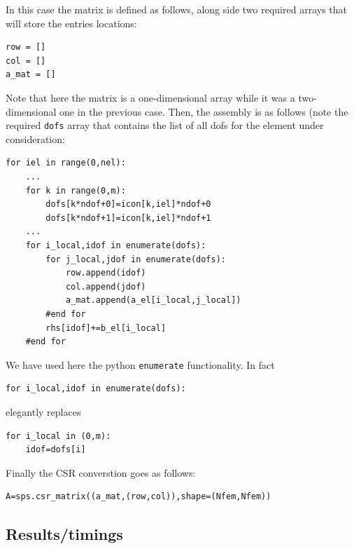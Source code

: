 In this case the matrix is defined as follows, along side two 
required arrays that will store the entries locations:
\begin{lstlisting}
row = [] 
col = []
a_mat = []
\end{lstlisting}
Note that here the matrix is a one-dimensional array
while it was a two-dimensional one in the previous case.
Then, the assembly is as follows (note the required \lstinline{dofs}
array that contains the list of all dofs for the element under consideration:
\begin{lstlisting}
for iel in range(0,nel):
    ...
    for k in range(0,m):
        dofs[k*ndof+0]=icon[k,iel]*ndof+0
        dofs[k*ndof+1]=icon[k,iel]*ndof+1
    ...
    for i_local,idof in enumerate(dofs):
        for j_local,jdof in enumerate(dofs):
            row.append(idof)
            col.append(jdof)
            a_mat.append(a_el[i_local,j_local])
        #end for
        rhs[idof]+=b_el[i_local]
    #end for
\end{lstlisting}
We have used here the python \lstinline{enumerate}
functionality. In fact
\begin{lstlisting}
for i_local,idof in enumerate(dofs):
\end{lstlisting}
elegantly replaces
\begin{lstlisting}
for i_local in (0,m):
    idof=dofs[i]
\end{lstlisting}
Finally the CSR converstion goes as follows:
\begin{lstlisting}
A=sps.csr_matrix((a_mat,(row,col)),shape=(Nfem,Nfem))
\end{lstlisting}




\subsection*{Results/timings}

